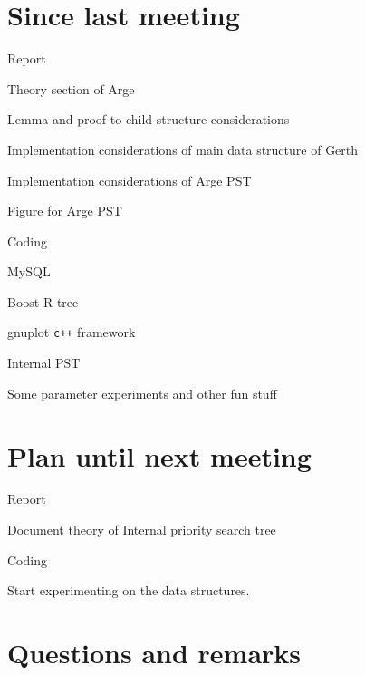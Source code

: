 \documentclass[a4paper,11pt,agenda,chair]{meetingmins}
\begin{document}
\maketitle

\section{Since last meeting}
\begin{items}
\item Report
	\begin{items}
		\item Theory section of Arge
		\item Lemma and proof to child structure considerations
		\item Implementation considerations of main data structure of Gerth
		\item Implementation considerations of Arge PST
		\item Figure for Arge PST		
	\end{items}
\item Coding
	\begin{items}
		\item MySQL
		\item Boost R-tree
		\item gnuplot \texttt{c++} framework
		\item Internal PST
		\item Some parameter experiments and other fun stuff
	\end{items}
\end{items}

\section{Plan until next meeting}
\begin{items}
\item Report
	\begin{items}
		\item Document theory of Internal priority search tree
	\end{items}
\item Coding
	\begin{items}
		\item Start experimenting on the data structures.
	\end{items}
\end{items}

\section{Questions and remarks}
\end{document}
